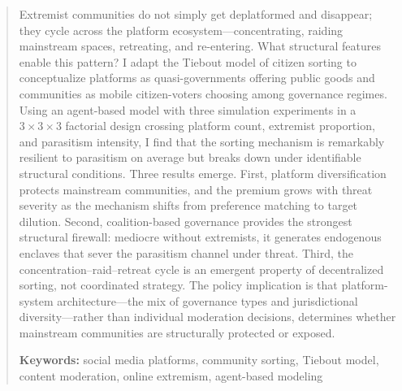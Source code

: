 \begin{abstract}
Extremist communities do not simply get deplatformed and disappear; they cycle across the platform ecosystem---concentrating, raiding mainstream spaces, retreating, and re-entering. What structural features enable this pattern? I adapt the Tiebout model of citizen sorting to conceptualize platforms as quasi-governments offering public goods and communities as mobile citizen-voters choosing among governance regimes. Using an agent-based model with three simulation experiments in a $3 \times 3 \times 3$ factorial design crossing platform count, extremist proportion, and parasitism intensity, I find that the sorting mechanism is remarkably resilient to parasitism on average but breaks down under identifiable structural conditions. Three results emerge. First, platform diversification protects mainstream communities, and the premium grows with threat severity as the mechanism shifts from preference matching to target dilution. Second, coalition-based governance provides the strongest structural firewall: mediocre without extremists, it generates endogenous enclaves that sever the parasitism channel under threat. Third, the concentration--raid--retreat cycle is an emergent property of decentralized sorting, not coordinated strategy. The policy implication is that platform-system architecture---the mix of governance types and jurisdictional diversity---rather than individual moderation decisions, determines whether mainstream communities are structurally protected or exposed.

\textbf{Keywords:} social media platforms, community sorting, Tiebout model, content moderation, online extremism, agent-based modeling
\end{abstract}
